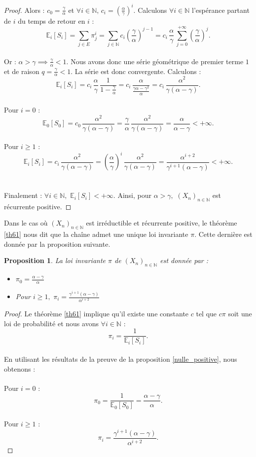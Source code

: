 \documentclass[12pt,a4paper]{report}
\newtheorem{prop}[thm]{Proposition}
\theoremstyle{remark}
\begin{document}
\begin{proof}
Alors : $c_0 = \frac{\gamma}{\alpha}$ et $\forall i \in \mathbb{N}, \, c_i = \left(\frac{\alpha}{\gamma}\right)^i$. Calculons $\forall i \in \mathbb{N}$ l'espérance partant de $i$ du temps de retour en $i$ :
$$\mathbb{E}_i[S_i] = \sum\limits_{j\in E }\pi_j^i = \sum\limits_{j\in \mathbb{N} }c_i \left(\frac{\gamma}{\alpha}\right)^{j-1} = c_i \,  \frac{\alpha}{\gamma} \, \sum\limits_{j = 0 }^{+\infty} \left(\frac{\gamma}{\alpha}\right)^{j}.$$
\\
Or : $\alpha > \gamma \implies \frac{\gamma}{\alpha} < 1$. Nous avons donc une série géométrique de premier terme $1$ et de raison $q = \frac{\gamma}{\alpha} < 1$. La série est donc convergente. Calculons :
$$\mathbb{E}_i[S_i] = c_i \,  \frac{\alpha}{\gamma} \, \frac{1}{1 - \frac{\gamma}{\alpha}} = c_i \,  \frac{\alpha}{ \frac{\gamma \alpha - \gamma^2}{\alpha}} = c_i \,  \frac{\alpha^2}{\gamma(\alpha - \gamma)}.$$
\\
Pour $i = 0$ : $$\mathbb{E}_0[S_0] = c_0 \,  \frac{\alpha^2}{\gamma(\alpha - \gamma)} = \frac{\gamma}{\alpha}  \,  \frac{\alpha^2}{\gamma(\alpha - \gamma)} = \frac{\alpha}{\alpha - \gamma} < +\infty.$$
\\
Pour $i \geqslant 1$ : $$\mathbb{E}_i[S_i] = c_i \,  \frac{\alpha^2}{\gamma(\alpha - \gamma)} = \left(\frac{\alpha}{\gamma}\right)^i  \,  \frac{\alpha^2}{\gamma(\alpha - \gamma)} = \frac{\alpha^{i+2}}{\gamma^{i+1}(\alpha - \gamma)} < +\infty.$$
\\
\\
Finalement : $\forall i \in \mathbb{N}, \, \, \mathbb{E}_i[S_i] < +\infty$. Ainsi, pour $\alpha > \gamma, \, \, (X_n)_{n \in \mathbb{N}}$ est récurrente positive.
\end{proof}
Dans le cas où $(X_n)_{n \in \mathbb{N}}$ est irréductible et récurrente positive, le théorème \ref{th61} nous dit que la chaîne admet une unique loi invariante $\pi$. Cette dernière est donnée par la proposition suivante.
\begin{prop}
La loi invariante $\pi$ de $(X_n)_{n \in \mathbb{N}}$ est donnée par :
\begin{itemize}
    \item $\pi_0 = \frac{\alpha - \gamma}{\alpha}$
    \item Pour $i \geqslant 1, \, \, \pi_i = \frac{\gamma^{i+1}(\alpha - \gamma)}{\alpha^{i+2}}$
\end{itemize}
\end{prop}
\begin{proof}
Le théorème \ref{th61} implique qu'il existe une constante $c$ tel que $c\pi$ soit une loi de probabilité et nous avons $\forall i \in \mathbb{N}$ :
$$\pi_i = \frac{1}{\mathbb{E}_i[S_i]}.$$
\\
En utilisant les résultats de la preuve de la proposition \ref{nulle_positive}, nous obtenons :
\\
\\
Pour $i = 0$ : $$\pi_0 = \frac{1}{\mathbb{E}_0[S_0]} = \frac{\alpha - \gamma}{\alpha}.$$
\\
Pour $i \geqslant 1$ : $$\pi_i = \frac{\gamma^{i+1}(\alpha - \gamma)}{\alpha^{i+2}}.$$
\end{proof}
\end{document}
